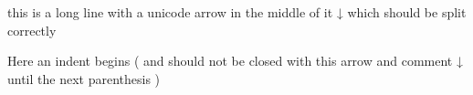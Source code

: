 \documentclass{article}
\begin{document}
this is a long line with a unicode arrow in the middle of it ↓ which should be split correctly

Here an indent begins (
and should not be closed with this arrow and comment ↓%
until the next parenthesis
)
\end{document}

